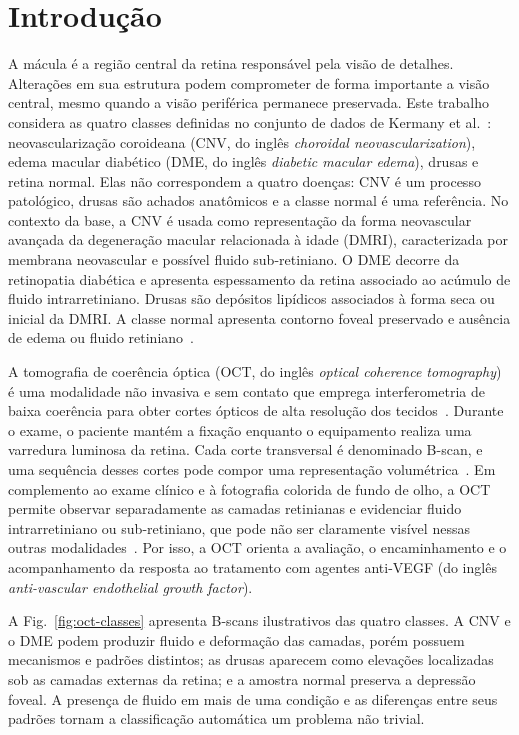 \documentclass[conference]{IEEEtran}
\begin{document}
\section{Introdução}

A mácula é a região central da retina responsável pela visão de detalhes. Alterações em sua estrutura podem comprometer de forma importante a visão central, mesmo quando a visão periférica permanece preservada. Este trabalho considera as quatro classes definidas no conjunto de dados de Kermany et al.~\cite{kermany2018}: neovascularização coroideana (CNV, do inglês \textit{choroidal neovascularization}), edema macular diabético (DME, do inglês \textit{diabetic macular edema}), drusas e retina normal. Elas não correspondem a quatro doenças: CNV é um processo patológico, drusas são achados anatômicos e a classe normal é uma referência. No contexto da base, a CNV é usada como representação da forma neovascular avançada da degeneração macular relacionada à idade (DMRI), caracterizada por membrana neovascular e possível fluido sub-retiniano. O DME decorre da retinopatia diabética e apresenta espessamento da retina associado ao acúmulo de fluido intrarretiniano. Drusas são depósitos lipídicos associados à forma seca ou inicial da DMRI. A classe normal apresenta contorno foveal preservado e ausência de edema ou fluido retiniano~\cite{kermany2018,conitec2021}.

A tomografia de coerência óptica (OCT, do inglês \textit{optical coherence tomography}) é uma modalidade não invasiva e sem contato que emprega interferometria de baixa coerência para obter cortes ópticos de alta resolução dos tecidos~\cite{huang1991,bouma2022}. Durante o exame, o paciente mantém a fixação enquanto o equipamento realiza uma varredura luminosa da retina. Cada corte transversal é denominado B-scan, e uma sequência desses cortes pode compor uma representação volumétrica~\cite{bouma2022}. Em complemento ao exame clínico e à fotografia colorida de fundo de olho, a OCT permite observar separadamente as camadas retinianas e evidenciar fluido intrarretiniano ou sub-retiniano, que pode não ser claramente visível nessas outras modalidades~\cite{kermany2018}. Por isso, a OCT orienta a avaliação, o encaminhamento e o acompanhamento da resposta ao tratamento com agentes anti-VEGF (do inglês \textit{anti-vascular endothelial growth factor}).

A Fig.~\ref{fig:oct-classes} apresenta B-scans ilustrativos das quatro classes. A CNV e o DME podem produzir fluido e deformação das camadas, porém possuem mecanismos e padrões distintos; as drusas aparecem como elevações localizadas sob as camadas externas da retina; e a amostra normal preserva a depressão foveal. A presença de fluido em mais de uma condição e as diferenças entre seus padrões tornam a classificação automática um problema não trivial.
\end{document}

